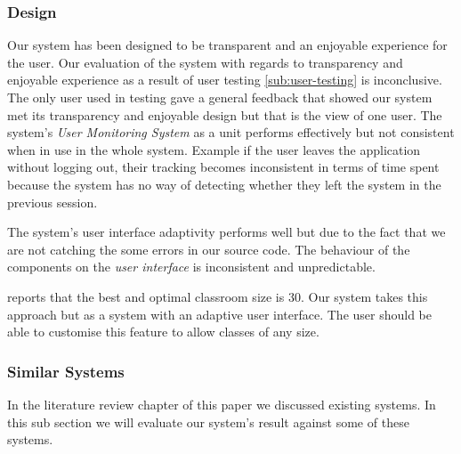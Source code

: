 \subsubsection{Design}
Our system has been designed to be transparent and an enjoyable experience for the user. Our evaluation of the system with regards to transparency and enjoyable experience as a result of user testing \ref{sub:user-testing} is inconclusive. The only user used in testing gave a general feedback that showed our system met its transparency and enjoyable design but that is the view of one user. The system's \emph{User Monitoring System} as a unit performs effectively but not consistent when in use in the whole system. Example if the user leaves the application without logging out, their tracking becomes inconsistent in terms of time spent because the system has no way of detecting whether they left the system in the previous session.

The system's user interface adaptivity performs well but due to the fact that we are not catching the some errors in our source code. The behaviour of the components on the \emph{user interface} is inconsistent and unpredictable.

\cite{OFSTED} reports that the best and optimal classroom size is 30. Our system takes this approach but as a system with an adaptive user interface. The user should be able to customise this feature to allow classes of any size. 



\subsubsection{Similar Systems}
In the literature review chapter of this paper we discussed existing systems. In this sub section we will evaluate our system's result against some of these systems.

